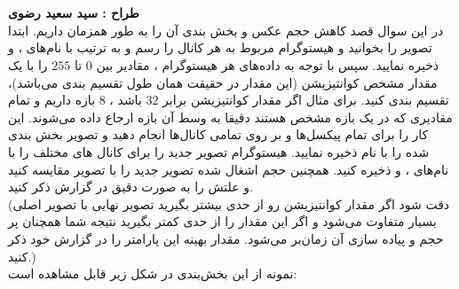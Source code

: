 \documentclass[a4]{article}
\begin{document}
\section{}
\textbf{طراح :‌ سید سعید رضوی}
\vspace{0.5cm}
\\
در این سوال قصد کاهش حجم عکس
و بخش بندی 
آن را به طور همزمان داریم.
ابتدا تصویر
 را بخوانید  و هیستوگرام مربوط به هر کانال را رسم  و به ترتیب با نام‌های 
،
و
 ذخیره نمایید. سپس با توجه به داده‌های هر هیستوگرام ، مقادیر بین $ 0 $ تا $ 255  $ را با یک مقدار مشخص کوانتیزیشن (این مقدار در حقیقت همان طول تقسیم بندی می‌باشد)، تقسیم بندی 
 کنید. برای مثال اگر مقدار کوانتیزیشن برابر $ 32 $ باشد ، $ 8 $ بازه داریم و تمام مقادیری که در یک بازه مشخص هستند دقیقا به وسط آن بازه ارجاع داده  می‌شوند. این کار را برای تمام پیکسل‌ها و بر روی تمامی کانال‌ها انجام دهید و تصویر بخش بندی شده را با نام
ذخیره نمایید.  هیستوگرام تصویر جدید را برای کانال های مختلف را با نام‌های
،
و
ذخیره کنید. همچنین حجم اشغال شده تصویر جدید را با تصویر
مقایسه کنید و علتش را به صورت دقیق در گزارش ذکر کنید.
\\
(دقت شود اگر مقدار کوانتیزیشن رو از حدی بیشتر بگیرید تصویر نهایی با تصویر اصلی بسیار متفاوت می‌شود و اگر این مقدار را از حدی کمتر بگیرید نتیجه شما همچنان پر حجم  و پیاده سازی آن زمان‌بر می‌شود. مقدار بهینه این پارامتر را در گزارش خود ذکر کنید.)  
\\
نمونه از این بخش‌بندی در شکل زیر قابل مشاهده است: 
\end{document}
